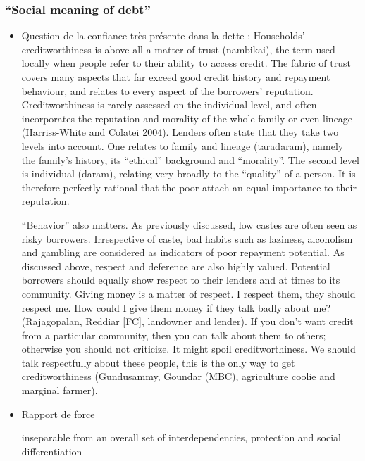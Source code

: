 \documentclass[a4paper, 11pt, onecolumn]{article}
\begin{document}


	\subsubsection{``Social meaning of debt''}
\begin{itemize}
\item Question de la confiance très présente dans la dette :
\cite{Guerin2014a} Households’ creditworthiness is above all a matter of trust (nambikai), the term used locally
when people refer to their ability to access credit. The fabric of trust covers many aspects that
far exceed good credit history and repayment behaviour, and relates to every aspect of the
borrowers’ reputation. Creditworthiness is rarely assessed on the individual level, and often
incorporates the reputation and morality of the whole family or even lineage (Harriss-White
and Colatei 2004). Lenders often state that they take two levels into account. One relates to
family and lineage (taradaram), namely the family’s history, its “ethical” background and
“morality”. The second level is individual (daram), relating very broadly to the “quality” of a
person. It is therefore perfectly rational that the poor attach an equal importance to their
reputation.

“Behavior” also matters. As previously discussed, low castes are often seen as risky
borrowers. Irrespective of caste, bad habits such as laziness, alcoholism and gambling are
considered as indicators of poor repayment potential. As discussed above, respect and deference are also highly valued. Potential borrowers should equally show respect to their
lenders and at times to its community.
Giving money is a matter of respect. I respect them, they should respect me. How could I give them
money if they talk badly about me? (Rajagopalan, Reddiar [FC], landowner and lender).
If you don’t want credit from a particular community, then you can talk about them to others; otherwise
you should not criticize. It might spoil creditworthiness. We should talk respectfully about these people,
this is the only way to get creditworthiness (Gundusammy, Goundar (MBC), agriculture coolie and
marginal farmer).

\item Rapport de force
\cite{Guerin2014}

\citep{Guerin2020a}
inseparable from an overall set of interdependencies, protection and social differentiation


\end{itemize}
\end{document}
